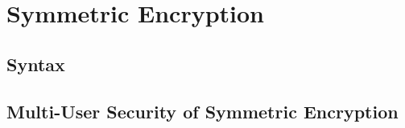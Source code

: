 \documentclass[../../main.tex]{subfiles}
\begin{document}
\onlyinsubfile
{
    
}

\section{Symmetric Encryption}\label{sec-se}
    \subsection{Syntax}
        
    \subsection{Multi-User Security of Symmetric Encryption}\label{sec-se-mu-defs}
        
        



\onlyinsubfile
{
    \begin{small}
        
        
    \end{small}
}
\end{document}
